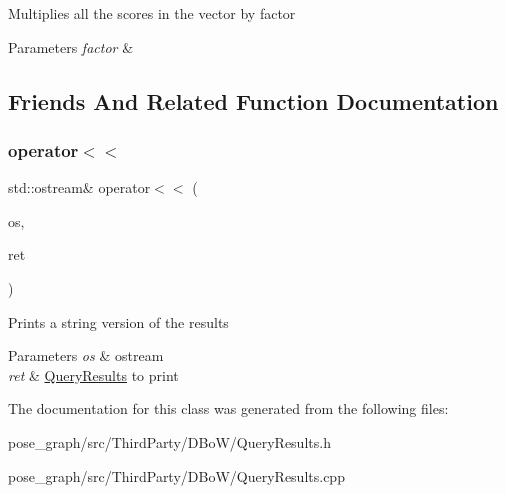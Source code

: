 Multiplies all the scores in the vector by factor 
\begin{DoxyParams}{Parameters}
{\em factor} & \\
\hline
\end{DoxyParams}


\subsection{Friends And Related Function Documentation}
\mbox{\label{classDBoW2_1_1QueryResults_aa03bed8e3c1357b52ce23ec7b9d3a149}} 
\subsubsection{\texorpdfstring{operator$<$$<$}{operator<<}}
{\footnotesize\ttfamily std\+::ostream\& operator$<$$<$ (\begin{DoxyParamCaption}\item[{std\+::ostream \&}]{os,  }\item[{const \hyperlink{classDBoW2_1_1QueryResults}{Query\+Results} \&}]{ret }\end{DoxyParamCaption})\hspace{0.3cm}{\ttfamily [friend]}}

Prints a string version of the results 
\begin{DoxyParams}{Parameters}
{\em os} & ostream \\
\hline
{\em ret} & \hyperlink{classDBoW2_1_1QueryResults}{Query\+Results} to print \\
\hline
\end{DoxyParams}


The documentation for this class was generated from the following files\+:\begin{DoxyCompactItemize}
\item 
pose\+\_\+graph/src/\+Third\+Party/\+D\+Bo\+W/Query\+Results.\+h\item 
pose\+\_\+graph/src/\+Third\+Party/\+D\+Bo\+W/Query\+Results.\+cpp\end{DoxyCompactItemize}
